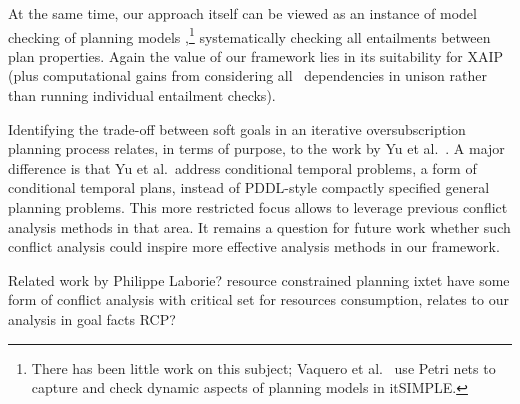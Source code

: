 At the same time, our approach itself can be viewed as an instance of
model checking of planning models
\cite{clarke:etal:01},\footnote{There has been little work on this
  subject; Vaquero et al.\  use Petri
  nets to capture and check dynamic aspects of planning models in
  itSIMPLE.}  systematically checking all entailments between plan
properties. Again the value of our framework lies in its suitability
for XAIP (plus computational gains from considering all
\props\ dependencies in unison rather than running individual
entailment checks).


%
Identifying the trade-off between soft goals in an iterative
oversubscription planning process relates, in terms of purpose, to the
work by Yu et al.\ \cite{yu:etal:jair-17}. A major difference is that
Yu et al.\ address conditional temporal problems, a form of
conditional temporal plans, instead of PDDL-style compactly specified
general planning problems. This more restricted focus allows to
leverage previous conflict analysis methods in that area. It remains a
question for future work whether such conflict analysis could inspire
more effective analysis methods in our framework.


Related work by Philippe Laborie? resource constrained planning ixtet
have some form of conflict analysis with critical set for resources
consumption, relates to our analysis in goal facts RCP?
